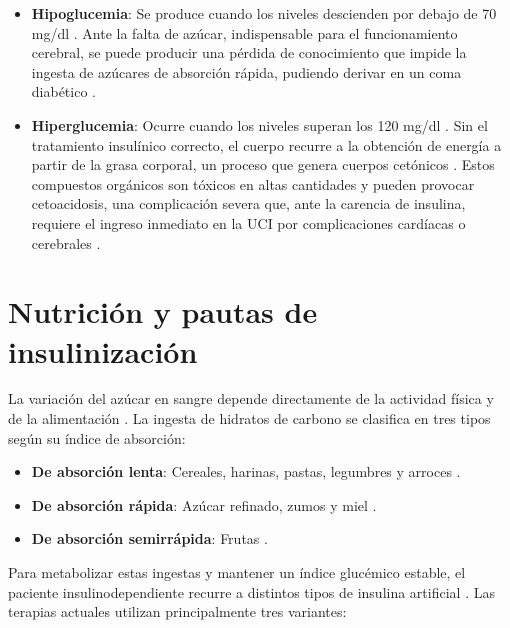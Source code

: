 \begin{itemize}
    \item \textbf{Hipoglucemia}: Se produce cuando los niveles descienden por debajo de 70 mg/dl \cite{idf_atlas_diabetes}. Ante la falta de azúcar, indispensable para el funcionamiento cerebral, se puede producir una pérdida de conocimiento que impide la ingesta de azúcares de absorción rápida, pudiendo derivar en un coma diabético \cite{ada_standards}.
    \item \textbf{Hiperglucemia}: Ocurre cuando los niveles superan los 120 mg/dl \cite{idf_atlas_diabetes}. Sin el tratamiento insulínico correcto, el cuerpo recurre a la obtención de energía a partir de la grasa corporal, un proceso que genera cuerpos cetónicos \cite{ada_standards}. Estos compuestos orgánicos son tóxicos en altas cantidades y pueden provocar cetoacidosis, una complicación severa que, ante la carencia de insulina, requiere el ingreso inmediato en la UCI por complicaciones cardíacas o cerebrales \cite{revespcardiol_diabetes}.
\end{itemize}

\section{Nutrición y pautas de insulinización}
La variación del azúcar en sangre depende directamente de la actividad física y de la alimentación \cite{who_diabetes}. La ingesta de hidratos de carbono se clasifica en tres tipos según su índice de absorción:

\begin{itemize}
    \item \textbf{De absorción lenta}: Cereales, harinas, pastas, legumbres y arroces \cite{cinfasalud_diabetes}.
    \item \textbf{De absorción rápida}: Azúcar refinado, zumos y miel \cite{cinfasalud_diabetes}.
    \item \textbf{De absorción semirrápida}: Frutas \cite{cinfasalud_diabetes}.
\end{itemize}

Para metabolizar estas ingestas y mantener un índice glucémico estable, el paciente insulinodependiente recurre a distintos tipos de insulina artificial \cite{ada_standards}. Las terapias actuales utilizan principalmente tres variantes:

